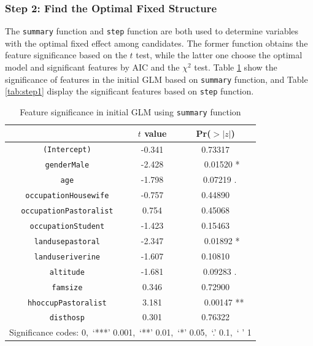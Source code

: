 \documentclass[11pt,twoside]{article}
\numberwithin{Theorem}{section}
\numberwithin{Definition}{section}
\numberwithin{Lemma}{section}
\numberwithin{Algorithm}{section}
\numberwithin{equation}{section}
\begin{document}
\subsubsection{Step 2: Find the Optimal Fixed Structure}

The \texttt{summary} function and \texttt{step} function are both used to determine variables with the optimal fixed effect among candidates. The former function obtains the feature significance based on the $t$ test, while the latter one choose the optimal model and significant features by AIC and the $\chi^2$ test. Table \ref{tab:summary1} show the significance of features in the initial GLM based on \texttt{summary} function, and Table \ref{tab:step1} display the significant features based on \texttt{step} function.

\begin{table}[!h]
	\centering
	\begin{tabular}{|c|c|c|}
		\hline
		 & $t$ value & Pr($>|z|$) \\
		\hline
		\texttt{(Intercept)} & -0.341 & 0.73317 \\
		\texttt{genderMale} & -2.428 & \ \ \ 0.01520 * \\
		\texttt{age} & -1.798 & \ \ 0.07219 . \\
		\texttt{occupationHousewife} & -0.757 & 0.44890 \\  
		\texttt{occupationPastoralist} & 0.754 & 0.45068 \\   
		\texttt{occupationStudent} & -1.423 & 0.15463 \\  
		\texttt{landusepastoral} & -2.347 & \ \ \ 0.01892 * \\ 
		\texttt{landuseriverine} & -1.607 & 0.10810 \\   
		\texttt{altitude} & -1.681 & \ \ 0.09283 . \\
		\texttt{famsize} & 0.346 & 0.72900 \\   
		\texttt{hhoccupPastoralist} & 3.181 & \ \ \ \ 0.00147 ** \\
		\texttt{disthosp} & 0.301 & 0.76322 \\   
		\hline
		\multicolumn{3}{|l|}{Significance codes: 0,\ ‘***’ 0.001,\ ‘**’ 0.01,\ ‘*’ 0.05,\ ‘.’ 0.1,\ ‘ ’ 1} \\
		\hline
	\end{tabular}
	\caption{Feature significance in initial GLM using \texttt{summary} function}
	\label{tab:summary1}
\end{table}
\end{document}
